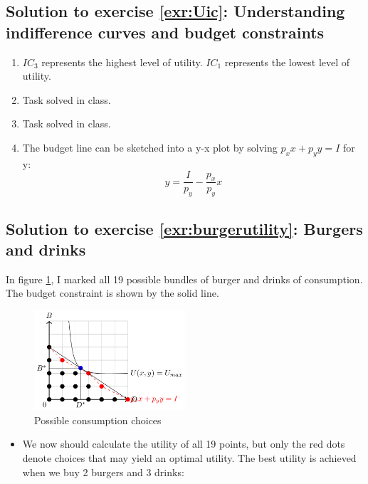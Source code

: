 \documentclass[
  12pt,
  oneside]{book}
\providecommand{\tightlist}{%
  \setlength{\itemsep}{0pt}\setlength{\parskip}{0pt}}
\theoremstyle{definition}
\theoremstyle{definition}
\theoremstyle{definition}
\theoremstyle{definition}
\theoremstyle{remark}
\begin{document}
\hypertarget{sol:Uic}{%
\subsection*{Solution to exercise \ref{exr:Uic}: Understanding indifference curves and budget constraints}\label{sol:Uic}}

\begin{enumerate}
\def\labelenumi{\alph{enumi})}
\tightlist
\item
  \(IC_3\) represents the highest level of utility. \(IC_1\) represents the lowest level of utility.\\
\item
  Task solved in class.
\item
  Task solved in class.
\item
  The budget line can be sketched into a y-x plot by solving \(p_xx+p_yy=I\) for y: \[y=\frac{I}{p_y}-\frac{p_x}{p_y}x\]
\end{enumerate}

\hypertarget{sol:burgerutility}{%
\subsection*{Solution to exercise \ref{exr:burgerutility}: Burgers and drinks}\label{sol:burgerutility}}

In figure \ref{fig:burgerutility}, I marked all 19 possible bundles of burger and drinks of consumption. The budget constraint is shown by the solid line.

\begin{figure}
\centering
\includegraphics[width=0.5\textwidth,height=\textheight]{fig/burgerutility.png}
\caption{\label{fig:burgerutility} Possible consumption choices}
\end{figure}

\begin{itemize}
\tightlist
\item
  We now should calculate the utility of all 19 points, but only the red dots denote choices that may yield an optimal utility. The best utility is achieved when we buy 2 burgers and 3 drinks:
\end{itemize}
\end{document}
